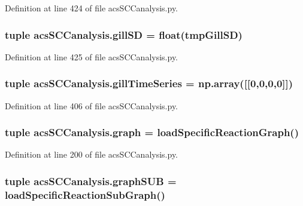 Definition at line 424 of file acs\-S\-C\-Canalysis.\-py.

\hypertarget{a00128_acdb3e72aea08c29494799fd08763b406}{
\subsubsection[{gill\-S\-D}]{\setlength{\rightskip}{0pt plus 5cm}tuple acs\-S\-C\-Canalysis.\-gill\-S\-D = float(tmp\-Gill\-S\-D)}}\label{a00128_acdb3e72aea08c29494799fd08763b406}


Definition at line 425 of file acs\-S\-C\-Canalysis.\-py.

\hypertarget{a00128_a99669fe823cebc560b46c3746f9183e7}{
\subsubsection[{gill\-Time\-Series}]{\setlength{\rightskip}{0pt plus 5cm}tuple acs\-S\-C\-Canalysis.\-gill\-Time\-Series = np.\-array(\mbox{[}\mbox{[}0,0,0,0\mbox{]}\mbox{]})}}\label{a00128_a99669fe823cebc560b46c3746f9183e7}


Definition at line 406 of file acs\-S\-C\-Canalysis.\-py.

\hypertarget{a00128_ab45392da38059bf7557c22cbc73e5580}{
\subsubsection[{graph}]{\setlength{\rightskip}{0pt plus 5cm}tuple acs\-S\-C\-Canalysis.\-graph = {\bf load\-Specific\-Reaction\-Graph}()}}\label{a00128_ab45392da38059bf7557c22cbc73e5580}


Definition at line 200 of file acs\-S\-C\-Canalysis.\-py.

\hypertarget{a00128_ae307841da4a073fad4f6eaa172b0b970}{
\subsubsection[{graph\-S\-U\-B}]{\setlength{\rightskip}{0pt plus 5cm}tuple acs\-S\-C\-Canalysis.\-graph\-S\-U\-B = {\bf load\-Specific\-Reaction\-Sub\-Graph}()}}\label{a00128_ae307841da4a073fad4f6eaa172b0b970}


